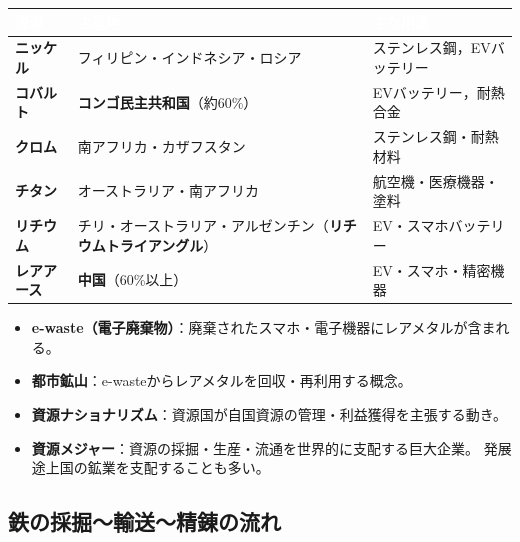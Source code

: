 \documentclass[a4paper,11pt]{article}
\newcommand{\imp}[1]{\textbf{\textcolor{mainred}{#1}}}
\newcommand{\key}[1]{\textbf{\textcolor{mainblue}{#1}}}
\begin{document}
\begin{tcolorbox}[pointbox, title={レアメタルの種類と産地・用途}]
\begin{center}
\begin{tabular}{C{2.2cm}C{3.5cm}C{5.5cm}}
\toprule
{}\textcolor{white}{\textbf{資源}} & \textcolor{white}{\textbf{主産地}} & \textcolor{white}{\textbf{主な用途}} \\
\midrule
\key{ニッケル} & フィリピン・インドネシア・ロシア & ステンレス鋼，EVバッテリー \\
\key{コバルト} & \imp{コンゴ民主共和国}（約60\%） & EVバッテリー，耐熱合金 \\
\key{クロム} & 南アフリカ・カザフスタン & ステンレス鋼・耐熱材料 \\
\key{チタン} & オーストラリア・南アフリカ & 航空機・医療機器・塗料 \\
\key{リチウム} & チリ・オーストラリア・アルゼンチン（\imp{リチウムトライアングル}） & EV・スマホバッテリー \\
\key{レアアース} & \imp{中国}（60\%以上） & EV・スマホ・精密機器 \\
\bottomrule
\end{tabular}
\end{center}

\medskip
\begin{itemize}[leftmargin=1em]
  \item \key{e-waste（電子廃棄物）}：廃棄されたスマホ・電子機器にレアメタルが含まれる。
  \item \key{都市鉱山}：e-wasteからレアメタルを回収・再利用する概念。
  \item \key{資源ナショナリズム}：資源国が自国資源の管理・利益獲得を主張する動き。
  \item \key{資源メジャー}：資源の採掘・生産・流通を世界的に支配する巨大企業。
    発展途上国の鉱業を支配することも多い。
\end{itemize}
\end{tcolorbox}

\vspace{2mm}

\subsection{鉄の採掘〜輸送〜精錬の流れ}
\end{document}

